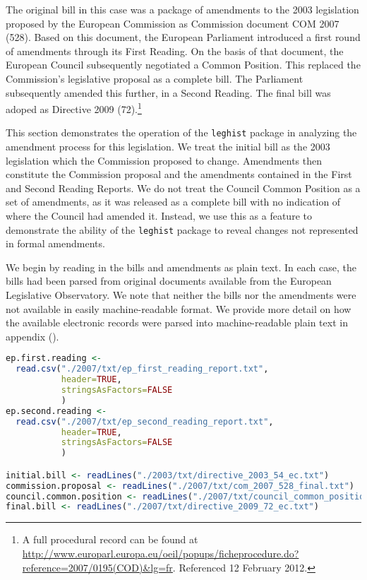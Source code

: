 \documentclass[11pt]{article}
\begin{document}
The original bill in this case was a package of amendments to the 2003
legislation proposed by the European Commission as Commission document
COM 2007 (528). Based on this document, the European Parliament
introduced a first round of amendments through its First Reading. On
the basis of that document, the European Council subsequently
negotiated a Common Position. This replaced the Commission's
legislative proposal as a complete bill. The Parliament subsequently
amended this further, in a Second Reading. The final bill was
adoped as Directive 2009 (72).\footnote{A full procedural record can
  be found at
  \url{http://www.europarl.europa.eu/oeil/popups/ficheprocedure.do?reference=2007/0195(COD)&lg=fr}. Referenced
12 February 2012.} 

This section demonstrates the operation of the \texttt{leghist}
package in analyzing the amendment process for this legislation. We
treat the initial bill as the 2003 legislation which the Commission
proposed to change. Amendments then constitute the Commission proposal
and the amendments contained in the First and Second Reading
Reports. We do not treat the Council Common Position as a set of
amendments, as it was released as a complete bill with no indication
of where the Council had amended it. Instead, we use this as a feature
to demonstrate the ability of the \texttt{leghist} package to reveal
changes not represented in formal amendments. 

We begin by reading in the bills and amendments as plain text. In each
case, the bills had been parsed from original documents available from
the European Legislative Observatory. We note that neither the bills
nor the amendments were
not available in easily machine-readable format. We provide more
detail on how the available electronic records were parsed into
machine-readable plain text in appendix (). 

\begin{lstlisting}[language=R, numbers=none]
ep.first.reading <- 
  read.csv("./2007/txt/ep_first_reading_report.txt",
           header=TRUE,
           stringsAsFactors=FALSE
           )
ep.second.reading <-
  read.csv("./2007/txt/ep_second_reading_report.txt",
           header=TRUE,
           stringsAsFactors=FALSE
           )

initial.bill <- readLines("./2003/txt/directive_2003_54_ec.txt")
commission.proposal <- readLines("./2007/txt/com_2007_528_final.txt")
council.common.position <- readLines("./2007/txt/council_common_position.txt")
final.bill <- readLines("./2007/txt/directive_2009_72_ec.txt")
\end{lstlisting}
\end{document}
